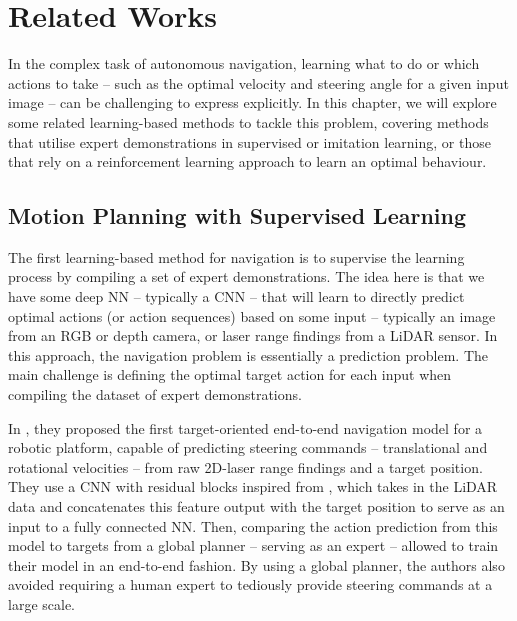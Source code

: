 \chapter{Related Works}
\label{chap:3_related_works}
\begin{comment}
There is extensive prior work in learning-based methods for autonomous navigation. Together, they encompass a variety of methods, from model-based to model-free, applied in environments including land, air, cluttered and dynamic. 
Despite these differences, the challenge of learning-based autonomous navigation is usually approached through the same three questions:
\begin{enumerate}
    \item How can the environment be perceived? 
    \item What actions can be taken? 
    \item How can these be learned?
\end{enumerate}
\end{comment}

In the complex task of autonomous navigation, learning what to do or which actions to take -- such as the optimal velocity and steering angle for a given input image -- can be challenging to express explicitly. In this chapter, we will explore some related learning-based methods to tackle this problem, covering methods that utilise expert demonstrations in supervised or imitation
learning, or those that rely on a reinforcement learning approach to learn an optimal behaviour.

\section{Motion Planning with Supervised Learning}
\label{sec:3_supervised_learning}
The first learning-based method for navigation is to supervise the learning process by compiling a set of expert demonstrations. The idea here is that we have some deep NN -- typically a CNN -- that will learn to directly predict optimal actions (or action sequences) based on some input -- typically an image from an RGB or depth camera, or laser range findings from a LiDAR sensor. In this approach, the navigation problem is essentially a prediction problem. The main challenge is defining the optimal target action for each input when compiling the dataset of expert demonstrations.

In \cite{pfeiffer2017perception}, they proposed the first target-oriented end-to-end navigation model for a robotic platform, capable of predicting steering commands -- translational and rotational velocities -- from raw 2D-laser range findings and a target position. They use a CNN with residual blocks inspired from \cite{KaimingResNet}, which takes in the LiDAR data and concatenates this feature output with the target position to serve as an input to a fully connected NN. Then, comparing the action prediction from this model to targets from a global planner -- serving as an expert -- allowed \cite{pfeiffer2017perception}  to train their model in an end-to-end fashion. By using a global planner, the authors also avoided requiring a human expert to tediously provide steering commands at a large scale.

